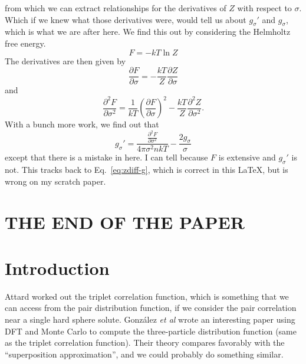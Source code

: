 \documentclass[letterpaper,twocolumn,amsmath,amssymb,pre,aps,10pt]{revtex4-1}
\begin{document}
from which we can extract relationships for the derivatives of $Z$
with respect to $\sigma$.  Which if we knew what those derivatives
were, would tell us about $g_\sigma'$ and $g_\sigma$, which is what we
are after here.  We find this out by considering the Helmholtz free
energy.
\begin{equation}
  F = -kT \ln Z
\end{equation}
The derivatives are then given by
\begin{equation}
  \frac{\partial F}{\partial \sigma} = -\frac{kT}{Z} \frac{\partial
    Z}{\partial \sigma}
\end{equation}
and
\begin{equation}
  \frac{\partial^2 F}{\partial \sigma^2} =
  \frac{1}{kT}\left(\frac{\partial F}{\partial \sigma}\right)^2
  -\frac{kT}{Z} \frac{\partial^2
    Z}{\partial \sigma^2}.
\end{equation}
With a bunch more work, we find out that
\begin{equation}
  g_\sigma' = \frac{\frac{\partial^2 F}{\partial
      \sigma^2}}{4\pi\sigma^2nkT}
  - \frac{2g_\sigma}{\sigma}
\end{equation}
except that there is a mistake in here.  I can tell because $F$ is
extensive and $g_\sigma'$ is not.  This tracks back to
Eq.~\ref{eq:zdiff-g}, which is correct in this \LaTeX, but is wrong on
my scratch paper.


\section{THE END OF THE PAPER}

\section{Introduction}

Attard worked out the triplet correlation function, which is something
that we can access from the pair distribution function, if we consider
the pair correlation near a single hard sphere
solute\cite{attard1989spherically}.  Gonz\'alez \emph{et al} wrote an
interesting paper using DFT and Monte Carlo to compute the
three-particle distribution function (same as the triplet correlation
function)\cite{gonzalez1999test}.  Their theory compares favorably
with the ``superposition approximation'', and we could probably do
something similar.
\end{document}
